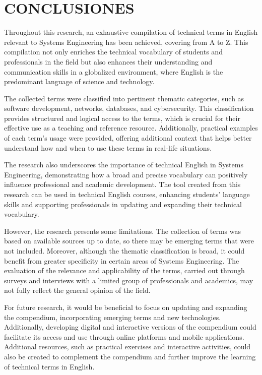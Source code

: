 \section{CONCLUSIONES}
Throughout this research, an exhaustive compilation of technical terms in English relevant to Systems Engineering has been achieved, covering from A to Z. This compilation not only enriches the technical vocabulary of students and professionals in the field but also enhances their understanding and communication skills in a globalized environment, where English is the predominant language of science and technology.

The collected terms were classified into pertinent thematic categories, such as software development, networks, databases, and cybersecurity. This classification provides structured and logical access to the terms, which is crucial for their effective use as a teaching and reference resource. Additionally, practical examples of each term's usage were provided, offering additional context that helps better understand how and when to use these terms in real-life situations.

The research also underscores the importance of technical English in Systems Engineering, demonstrating how a broad and precise vocabulary can positively influence professional and academic development. The tool created from this research can be used in technical English courses, enhancing students' language skills and supporting professionals in updating and expanding their technical vocabulary.

However, the research presents some limitations. The collection of terms was based on available sources up to date, so there may be emerging terms that were not included. Moreover, although the thematic classification is broad, it could benefit from greater specificity in certain areas of Systems Engineering. The evaluation of the relevance and applicability of the terms, carried out through surveys and interviews with a limited group of professionals and academics, may not fully reflect the general opinion of the field.

For future research, it would be beneficial to focus on updating and expanding the compendium, incorporating emerging terms and new technologies. Additionally, developing digital and interactive versions of the compendium could facilitate its access and use through online platforms and mobile applications. Additional resources, such as practical exercises and interactive activities, could also be created to complement the compendium and further improve the learning of technical terms in English.


